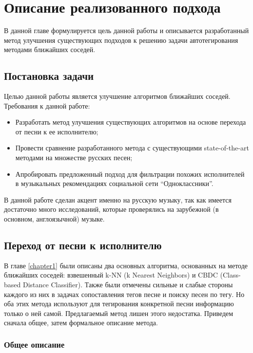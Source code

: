 \chapter{Описание реализованного подхода}
\label{chapter2}

В данной главе формулируется цель данной работы и описывается разработанный метод улучшения существующих подходов 
к решению задачи автотегирования методами ближайших соседей.

\section{Постановка задачи}
Целью данной работы является улучшение алгоритмов ближайших соседей. Требования к данной работе:
\begin{itemize}
 \item Разработать метод улучшения существующих алгоритмов на основе перехода от песни к ее исполнителю;
 \item Провести сравнение разработанного метода с существующими state-of-the-art методами на множестве русских песен;
 \item Апробировать предложенный подход для фильтрации похожих исполнителей в музыкальных рекомендациях социальной сети ``Одноклассники''.
\end{itemize}

В данной работе сделан акцент именно на русскую музыку, так как имеется достаточно много исследований, которые проверялись на зарубежной (в основном, англоязычной) музыке.

\section{Переход от песни к исполнителю}

В главе \ref{chapter1} были описаны два основных алгоритма, основанных на методе ближайших соседей: взвешенный k-NN (k Nearest Neighbors) и CBDC (Class-based Distance Classifier).
Также были отмечены сильные и слабые стороны каждого из них в задачах сопоставления тегов песне и поиску песен по тегу. Но оба этих метода используют для тегирования конкретной песни
информацию только о ней самой. Предлагаемый метод лишен этого недостатка. Приведем сначала общее, затем формальное описание метода.

\subsection{Общее описание}

